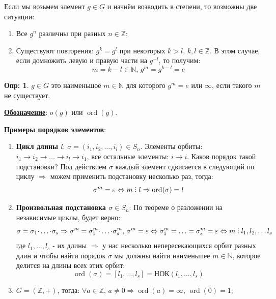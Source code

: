 \documentclass[12pt]{article}
\newcommand{\MN}{\mathbb{N}}
\newcommand{\MZ}{\mathbb{Z}}
\newcommand{\VE}{\varepsilon}
\theoremstyle{definition}
\newtheorem{defn}{Опр:}
\DeclareRobustCommand{\divby}{%
	\mathrel{\text{\vbox{\baselineskip.65ex\lineskiplimit0pt\hbox{.}\hbox{.}\hbox{.}}}}%
}
\DeclareMathOperator\ord{ord}
\begin{document}
Если мы возьмем элемент $g\in G$ и начнём возводить в степени, то возможны две ситуации:
\begin{enumerate}[label=\arabic*)]
	\item Все $g^n$ различны при разных $n \in \MZ$;
	\item Существуют повторения: $g^k = g^l$ при некоторых $k > l, \, k,l \in \MZ$. В этом случае, если домножить левую и правую части на $g^{-l}$, то получим:
	$$
		m = k - l \in \MN, \, g^{m} = g^{k - l} = e
	$$
\end{enumerate}

\begin{defn}
	 $g \in G$ это наименьшое $m \in \MN$ для которого $g^m = e$ или $\infty$, если такого $m$ не существует.
\end{defn}
\textbf{\uline{Обозначение}}: $o(g)$ или $\ord(g)$.

\textbf{Примеры порядков элементов}:
\begin{enumerate}[label=\arabic*)]
	\item \textbf{Цикл длины $l$}: $\sigma = (i_1, i_2,\dotsc,i_l) \in S_n$. Элементы орбиты: $i_1 \to i_2 \to \dotsc \to i_l \to i_1$, все остальные элементы: $i \to i$. Каков порядок такой подстановки? Под действием $\sigma$ каждый элемент сдвигается в следующий по циклу $\Rightarrow$ можем применить подстановку несколько раз, тогда:
	$$
		\sigma^m = \VE \Leftrightarrow m \divby l \Rightarrow \ord(\sigma) = l
	$$
	\item \textbf{Произвольная подстановка $\sigma \in S_n$}: По теореме о разложении на независимые циклы, будет верно:
	$$
		\sigma = \sigma_1{\cdot}\dotsc{\cdot}\sigma_s \Rightarrow \sigma^m = \sigma_1^m{\cdot}\dotsc{\cdot}\sigma_s^m, \, \sigma^m = \VE \Leftrightarrow \sigma_1^m = \dotsc  =\sigma_s^m = \VE \Leftrightarrow m \divby l_1, l_2,\dotsc l_s
	$$
	где $l_1,\dotsc,l_s$ - их длины $\Rightarrow$ у нас несколько непересекающихся орбит разных длин и чтобы найти порядок $\sigma$ мы должны найти наименьшее $m \in \MN$, которое делится на длины всех этих орбит:
	$$
		\ord(\sigma) = [l_1,\dotsc, l_s] = \text{НОК}(l_1,\dotsc, l_s)
	$$
	\item $G = (\MZ, +)$, тогда: $\forall a \in \MZ, \, a \neq 0 \Rightarrow \ord(a) = \infty,\, \ord(0) = 1$; 
\end{enumerate}
\end{document}
